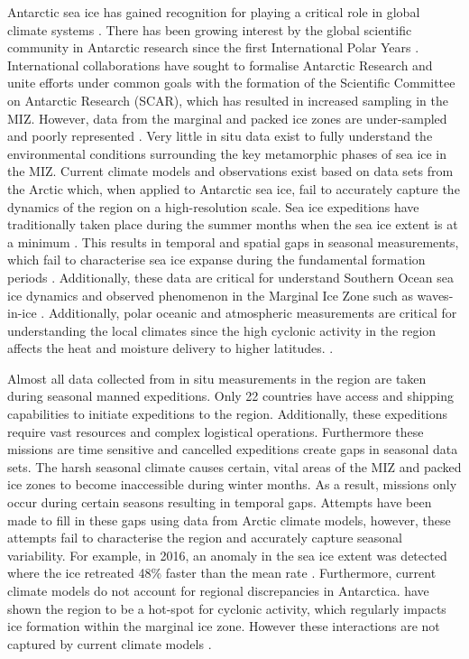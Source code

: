 Antarctic sea ice has gained recognition for playing a critical role in global climate systems \cite{kennicutt2016delivering}. There has been growing interest by the global scientific community in Antarctic research since the first International Polar Years \cite{kennicutt2016delivering}. International collaborations have sought to formalise Antarctic Research and unite efforts under common goals \cite{kennicutt2016delivering} with the formation of the Scientific Committee on Antarctic Research (SCAR), which has resulted in increased sampling in the MIZ. However, data from the marginal and packed ice zones are under-sampled and poorly represented \cite{vichi2019effects}. Very little in situ data exist to fully understand the environmental conditions surrounding the key metamorphic phases of sea ice in the MIZ. Current climate models and observations exist based on data sets from the Arctic \cite{vichi2019effects} which, when applied to Antarctic sea ice, fail to accurately capture the dynamics of the region on a high-resolution scale. Sea ice expeditions have traditionally taken place during the summer months when the sea ice extent is at a minimum \cite{kennicutt2016delivering}. This results in temporal and spatial gaps in seasonal measurements, which fail to characterise sea ice expanse during the fundamental formation periods \cite{MAKSYM2012seaiceextent}. Additionally, these data are critical for understand Southern Ocean sea ice dynamics and observed phenomenon in the Marginal Ice Zone such as waves-in-ice \cite{kohout2014storm}. Additionally, polar oceanic and atmospheric measurements are critical for understanding the local climates since the high cyclonic activity in the region affects the heat and moisture delivery to higher latitudes. \cite{vichi2019effects}.

Almost all data collected from in situ measurements in the region are taken during seasonal manned expeditions. Only 22 countries have access and shipping capabilities to initiate expeditions to the region. Additionally, these expeditions require vast resources and complex logistical operations. Furthermore these missions are time sensitive and cancelled expeditions create gaps in seasonal data sets. The harsh seasonal climate causes certain, vital areas of the MIZ and packed ice zones to become inaccessible during winter months. As a result, missions only occur during certain seasons resulting in temporal gaps. Attempts have been made to fill in these gaps using data from Arctic climate models, however, these attempts fail to characterise the region and accurately capture seasonal variability. For example, in 2016, an anomaly in the sea ice extent was detected where the ice retreated 48\% faster than the mean rate \cite{turner2017unprecedented}. Furthermore, current climate models do not account for regional discrepancies in Antarctica. \textcite{vichi2019effects} have shown the region to be a hot-spot for cyclonic activity, which regularly impacts ice formation within the marginal ice zone. However these interactions are not captured by current climate models \cite{vichi2019effects}.\par

